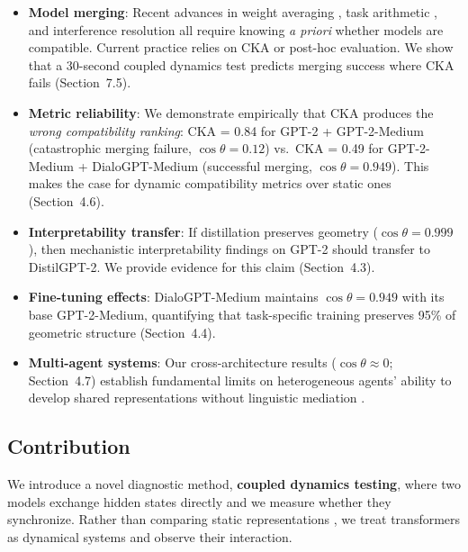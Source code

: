 \documentclass[10pt]{article} %
\theoremstyle{plain}
\theoremstyle{definition}
\theoremstyle{remark}
\begin{document}
\begin{itemize}
    \item \textbf{Model merging}: Recent advances in weight averaging \citep{wortsman2022model}, task arithmetic \citep{ilharco2023task}, and interference resolution \citep{yadav2023ties} all require knowing \textit{a priori} whether models are compatible. Current practice relies on CKA or post-hoc evaluation. We show that a 30-second coupled dynamics test predicts merging success where CKA fails (Section~7.5).
    
    \item \textbf{Metric reliability}: We demonstrate empirically that CKA produces the \textit{wrong compatibility ranking}: CKA = 0.84 for GPT-2 + GPT-2-Medium (catastrophic merging failure, $\cos \theta = 0.12$) vs.\ CKA = 0.49 for GPT-2-Medium + DialoGPT-Medium (successful merging, $\cos \theta = 0.949$). This makes the case for dynamic compatibility metrics over static ones (Section~4.6).
    
    \item \textbf{Interpretability transfer}: If distillation preserves geometry ($\cos \theta = 0.999$), then mechanistic interpretability findings \citep{elhage2021mathematical} on GPT-2 should transfer to DistilGPT-2. We provide evidence for this claim (Section~4.3).
    
    \item \textbf{Fine-tuning effects}: DialoGPT-Medium maintains $\cos \theta = 0.949$ with its base GPT-2-Medium, quantifying that task-specific training preserves 95\% of geometric structure (Section~4.4).
    
    \item \textbf{Multi-agent systems}: Our cross-architecture results ($\cos \theta \approx 0$; Section~4.7) establish fundamental limits on heterogeneous agents' ability to develop shared representations without linguistic mediation \citep{moschella2023relative}.
\end{itemize}

\subsection{Contribution}

We introduce a novel diagnostic method, \textbf{coupled dynamics testing}, where two models exchange hidden states directly and we measure whether they synchronize. Rather than comparing static representations \citep{kornblith2019similarity,ding2021grounding}, we treat transformers as dynamical systems \citep{haber2017stable,chen2018neuralode} and observe their interaction.
\end{document}
